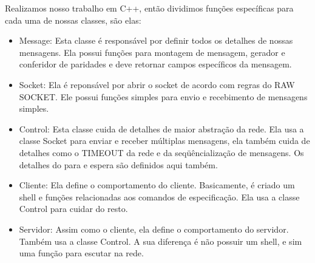 \documentclass[a4paper,10pt]{coursepaper}
\begin{document}
Realizamos nosso trabalho em C++, então dividimos funções específicas para cada uma de nossas classes, são elas:
\begin{itemize}
 \item Message:
 Esta classe é responsável por definir todos os detalhes de nossas mensagens. Ela possui funções para montagem de mensagem, gerador e conferidor de paridades e deve retornar campos específicos da mensagem.
 \item Socket:
 Ela é reponsável por abrir o socket de acordo com regras do RAW SOCKET. Ele possui funções simples para envio e recebimento de mensagens simples.
 \item Control:
 Esta classe cuida de detalhes de maior abstração da rede. Ela usa a classe Socket para enviar e receber múltiplas mensagens, ela também cuida de detalhes como o TIMEOUT da rede e da seqüêncialização de mensagens. Os detalhes do para e espera são definidos aqui também.
 \item Cliente:
 Ela define o comportamento do cliente. Basicamente, é criado um shell e funções relacionadas aos comandos de especificação. Ela usa a classe Control para cuidar do resto.
 \item Servidor:
 Assim como o cliente, ela define o comportamento do servidor. Também usa a classe Control. A sua diferença é não possuir um shell, e sim uma função para escutar na rede.
\end{itemize}
\end{document}
